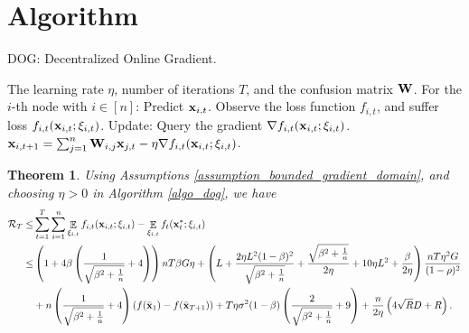 \documentclass{article}
\newtheorem{Theorem}{\bf{Theorem}}
\begin{document}
\section{Algorithm}


\newcommand\StateX{\Statex\hspace{\algorithmicindent}}
\begin{algorithm}[!]
   \caption{DOG: Decentralized Online Gradient.}
   \label{algo_dog}
   \begin{algorithmic}[1]
   \Require The learning rate $\eta$, number of iterations $T$, and the confusion matrix ${\bf W}$.
           \StateX For the $i$-th node with $i\in[n]$:
            \State \indent Predict ${\bf x}_{i,t}$.
            \State \indent Observe the loss function $f_{i,t}$,
            \StateX \indent and suffer loss $f_{i,t}({\bf x}_{i,t};\xi_{i,t})$.
            \StateX Update:
            \State \indent Query the gradient $\nabla f_{i,t}({\bf x}_{i,t};\xi_{i,t})$.  
            \State \indent ${\bf x}_{i,t+1} = \sum_{j=1}^n {\bf W}_{i,j}{\bf x}_{j,t} - \eta \nabla f_{i,t}({\bf x}_{i,t};\xi_{i,t})$. 
       \EndFor
   \end{algorithmic}
\end{algorithm}










\begin{Theorem}
\label{theorem_regret_upper_bound}
Using Assumptions \ref{assumption_bounded_gradient_domain}, and choosing $\eta>0$ in Algorithm \ref{algo_dog}, we have
\begin{align}
\nonumber
{\mathcal{R}}_T \le &  \sum_{t=1}^T\sum_{i=1}^n \mathop{\mathbb{E}}_{\xi_{i,t}}f_{i,t}({\bf x}_{i,t};\xi_{i,t}) - \mathop{\mathbb{E}}_{\xi_{i,t}}f_t({\bf x}_t^\ast;\xi_{i,t}) \\ \nonumber
\le & \left( 1 + 4\beta\left( \frac{1}{\sqrt{\beta^2 + \frac{1}{n}}}+4 \right) \right)nT\beta G \eta + \left(  L + \frac{2\eta L^2(1-\beta)^2}{\sqrt{\beta^2 + \frac{1}{n}}} + \frac{\sqrt{\beta^2 + \frac{1}{n}}}{2\eta} + 10\eta L^2  + \frac{\beta}{2\eta}  \right) \frac{nT \eta^2 G}{(1-\rho)^2} \\ \nonumber 
&+ n\left( \frac{1}{\sqrt{\beta^2 + \frac{1}{n}}} + 4 \right)\left( f(\bar{{\bf x}}_1) - f(\bar{{\bf x}}_{T+1}) \right) + T\eta \sigma^2 (1-\beta)\left( \frac{2}{\sqrt{\beta^2 + \frac{1}{n}}}+9 \right)   + \frac{n}{2\eta}\left(  4\sqrt{R}D + R   \right).
\end{align}


\end{Theorem}
\end{document}
